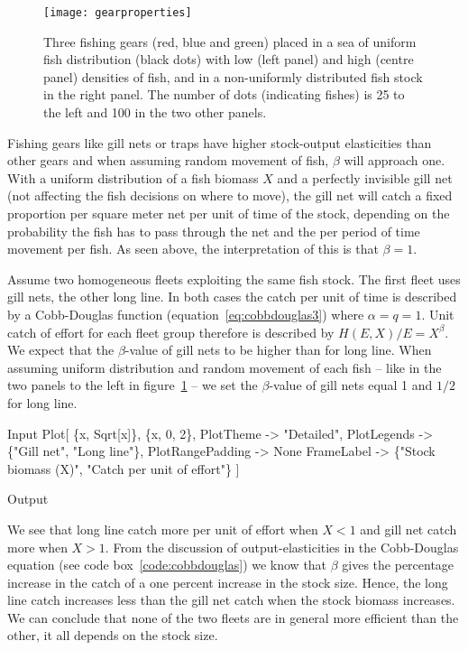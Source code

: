 \documentclass[11pt,fleqn]{book} %
\begin{document}
\begin{figure}[ht]
\centering
\texttt{[image: gearproperties]}
\caption{Three fishing gears (red, blue and green) placed in a sea of uniform fish distribution (black dots) with low (left panel) and high (centre panel) densities of fish, and in a non-uniformly distributed fish stock in the right panel. The number of dots (indicating fishes) is 25 to the left and 100 in the two other panels.}
\label{fig:gearproperties}
\end{figure}


Fishing gears like gill nets or traps have higher stock-output elasticities than other gears and when assuming random movement of fish, $\beta$ will approach one. With a uniform distribution of a fish biomass $X$ and a perfectly invisible gill net (not affecting the fish decisions on where to move), the gill net will catch a fixed proportion per square meter net per unit of time of the stock, depending on the probability the fish has to pass through the net and the per period of time movement per fish. As seen above, the interpretation of this is that $\beta = 1$.

\begin{theorem}
\hfill \break
Assume two homogeneous fleets exploiting the same fish stock. The first fleet uses gill nets, the other long line. In both cases the catch per unit of time is described by a Cobb-Douglas function (equation~\ref{eq:cobbdouglas3}) where $\alpha = q = 1$. Unit catch of effort for each fleet group therefore is described by $H(E, X)/E = X^\beta$. We expect that the $\beta$-value of gill nets to be higher than for long line. When assuming uniform distribution and random movement of each fish -- like in the two panels to the left in figure~\ref{fig:gearproperties} -- we set the $\beta$-value of gill nets equal 1 and $1/2$ for long line.
\begin{mmaCell}[index=1]{Input}
  Plot[
    \{x, Sqrt[x]\}, \{x, 0, 2\},
    PlotTheme        -> "Detailed",
    PlotLegends      -> \{"Gill net", "Long line"\},
    PlotRangePadding -> None
    FrameLabel       -> \{"Stock biomass (X)",
                        "Catch per unit of effort"\}
  ]
\end{mmaCell}
\begin{mmaCell}[moregraphics={moreig={scale=.8}}]{Output}
\end{mmaCell}
We see that long line catch more per unit of effort when $X < 1$ and gill net catch more when $X > 1$. From the discussion of output-elasticities in the Cobb-Douglas equation (see code box~\ref{code:cobbdouglas}) we know that $\beta$ gives the percentage increase in the catch of a one percent increase in the stock size. Hence, the long line catch increases less than the gill net catch when the stock biomass increases. We can conclude that none of the two fleets are in general more efficient than the other, it all depends on the stock size.
\label{code:costefficient}
\end{theorem}
\end{document}
